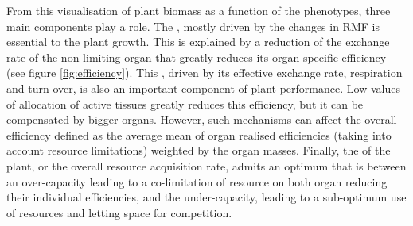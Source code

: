 From this visualisation of plant biomass as a function of the phenotypes, three main components play a role. The , mostly driven by the changes in RMF is essential to the plant growth. This is explained by a reduction of the exchange rate of the non limiting organ that greatly reduces its organ specific efficiency (see figure \ref{fig:efficiency}). This , driven by its effective exchange rate, respiration and turn-over, is also an important component of plant performance. Low values of allocation of active tissues greatly reduces this efficiency, but it can be compensated by bigger organs. However, such mechanisms can affect the overall efficiency defined as the average mean of organ realised efficiencies (taking into account resource limitations) weighted by the organ masses. Finally, the  of the plant, or the overall resource acquisition rate, admits an optimum that is between an over-capacity leading to a co-limitation of resource on both organ reducing their individual efficiencies, and the under-capacity, leading to a sub-optimum use of resources and letting space for competition.






%
%
%
%
%

